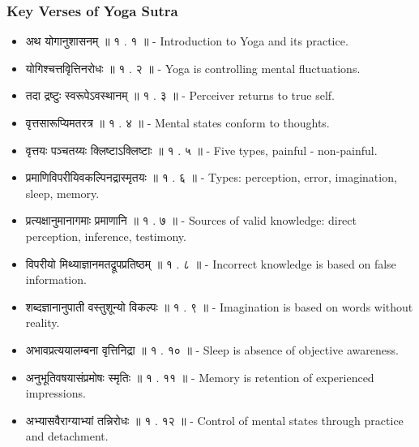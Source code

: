 \begin{frame}[fragile]\frametitle{Key Verses of Yoga Sutra}

    \begin{itemize}
        \item अथ योगानुशासनम् ॥ १ . १ ॥ - Introduction to Yoga and its practice.
        \item योगिश्चत्तवृित्तिनरोधः ॥ १ . २ ॥ - Yoga is controlling mental fluctuations.
        \item तदा द्रष्टुः स्वरूपेऽवस्थानम् ॥ १ . ३ ॥ - Perceiver returns to true self.
        \item वृत्तसारूप्यिमतरत्र ॥ १ . ४ ॥ - Mental states conform to thoughts.
        \item वृत्तयः पञ्चतय्यः क्लिष्टाऽक्लिष्टाः ॥ १ . ५ ॥ - Five types,  painful - non-painful.
        \item प्रमाणिविपरीयिवकल्पिनद्रास्मृतयः ॥ १ . ६ ॥ - Types: perception, error, imagination, sleep, memory.
        \item प्रत्यक्षानुमानागमाः प्रमाणानि ॥ १ . ७ ॥ - Sources of valid knowledge: direct perception, inference, testimony.
        \item विपरीयो मिथ्याज्ञानमतद्रूपप्रतिष्ठम् ॥ १ . ८ ॥ - Incorrect knowledge is based on false information.
        \item शब्दज्ञानानुपाती वस्तुशून्यो विकल्पः ॥ १ . ९ ॥ - Imagination is based on words without reality.
        \item अभावप्रत्ययालम्बना वृत्तिनिद्रा ॥ १ . १० ॥ - Sleep is absence of objective awareness.
        \item अनुभूतिवषयासंप्रमोषः स्मृतिः ॥ १ . ११ ॥ - Memory is retention of experienced impressions.
        \item अभ्यासवैराग्याभ्यां तन्निरोधः ॥ १ . १२ ॥ - Control of mental states through practice and detachment.
    \end{itemize}

\end{frame}


